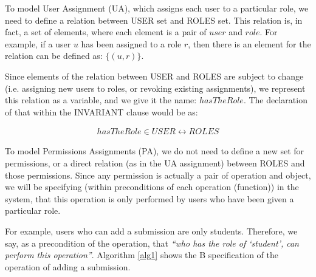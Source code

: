 To model User Assignment (UA), which assigns each user to a particular role, we need to define a relation between USER set and ROLES set.  This relation is, in fact, a set of elements, where each element is a pair of $user$ and $role$.  For example, if a user $u$ has been assigned to a role $r$, then there is an element for the relation can be defined as: $\{(u, r)\}$.

Since elements of the relation between USER and ROLES are subject to change (i.e. assigning new users to roles, or revoking existing assignments), we represent this relation as a variable, and we give it the name: $hasTheRole$.  The declaration of that within the INVARIANT clause would be as: 

\begin{align*}
hasTheRole \in USER \leftrightarrow ROLES
\end{align*}


To model Permissions Assignments (PA), we do not need to define a new set for permissions, or a direct relation (as in the UA assignment) between ROLES and those permissions.  Since any permission is actually a pair of operation and object, we will be specifying (within preconditions of each operation (function)) in the system, that this operation is only performed by users who have been given a particular role.

For example, users who can add a submission are only students.  Therefore, we say, as a precondition of the operation, that \textit{“who has the role of ‘student’, can perform this operation”}.  Algorithm \ref{alg1} shows the B specification of the operation of adding a submission.

